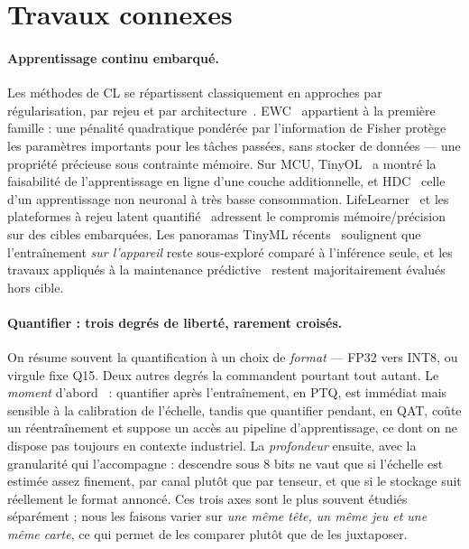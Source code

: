 \section{Travaux connexes}
\label{sec:related}

\paragraph{Apprentissage continu embarqué.} Les méthodes de CL se répartissent classiquement en approches
par régularisation, par rejeu et par architecture~\cite{DeLange2021Survey}. EWC~\cite{Kirkpatrick2017EWC}
appartient à la première famille : une pénalité quadratique pondérée par l'information de Fisher protège
les paramètres importants pour les tâches passées, sans stocker de données --- une propriété précieuse
sous contrainte mémoire. Sur MCU, \gls{TinyOL}~\cite{Ren2021TinyOL} a montré la faisabilité de l'apprentissage
en ligne d'une couche additionnelle, et \gls{HDC}~\cite{Benatti2019HDC} celle d'un apprentissage non neuronal à
très basse consommation. LifeLearner~\cite{Kwon2023LifeLearner} et les plateformes à rejeu latent
quantifié~\cite{Ravaglia2021QLRCL} adressent le compromis mémoire/précision sur des cibles embarquées. Les
panoramas \gls{TinyML} récents~\cite{Capogrosso2023TinyML} soulignent que l'entraînement \emph{sur l'appareil}
reste sous-exploré comparé à l'inférence seule, et les travaux appliqués à la maintenance
prédictive~\cite{Hurtado2023CLPdM} restent majoritairement évalués hors cible.

\paragraph{Quantifier : trois degrés de liberté, rarement croisés.} On résume souvent la quantification à
un choix de \emph{format} --- FP32 vers INT8, ou virgule fixe Q15. Deux autres degrés la commandent
pourtant tout autant. Le \emph{moment} d'abord~\cite{Jacob2018,Krishnamoorthi2018} : quantifier après l'entraînement, en PTQ, est immédiat mais
sensible à la calibration de l'échelle, tandis que quantifier pendant, en QAT, coûte un réentraînement et
suppose un accès au pipeline d'apprentissage, ce dont on ne dispose pas toujours en contexte industriel.
La \emph{profondeur} ensuite, avec la granularité qui l'accompagne : descendre sous 8 bits ne vaut que si
l'échelle est estimée assez finement, par canal plutôt que par tenseur, et que si le stockage suit
réellement le format annoncé. Ces trois axes sont le plus souvent étudiés séparément ; nous les faisons
varier sur \emph{une même tête, un même jeu et une même carte}, ce qui permet de les comparer plutôt que
de les juxtaposer.

